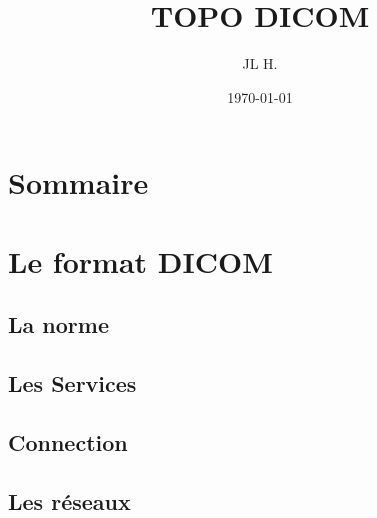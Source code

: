 \documentclass[t,8pt]{beamer}
\author{JL H.}
\date{\today}
\title{TOPO DICOM}
\begin{document}
\frame[plain]{\titlepage}
 
\section*{Sommaire}
\begin{frame}[c]
  \tableofcontents
\end{frame}

\section{Le format DICOM}

\subsection{La norme}



\subsection{Les Services}



\subsection{Connection}



\subsection{Les réseaux}


\end{document}
